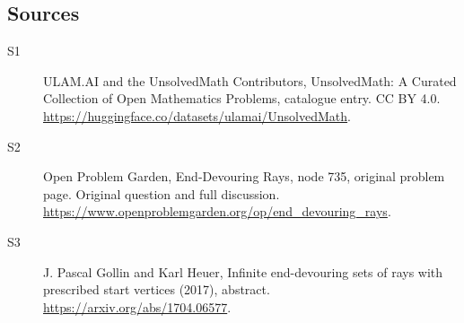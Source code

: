 \documentclass[11pt]{article}
\begin{document}
\subsection{Sources}
\begin{description}
\item[\hypertarget{source:statement:1}{S1}] ULAM.AI and the UnsolvedMath Contributors, UnsolvedMath: A Curated Collection of Open Mathematics Problems, catalogue entry. CC BY 4.0. \url{https://huggingface.co/datasets/ulamai/UnsolvedMath}.
\item[\hypertarget{source:statement:2}{S2}] Open Problem Garden, End-Devouring Rays, node 735, original problem page. Original question and full discussion. \url{https://www.openproblemgarden.org/op/end_devouring_rays}.
\item[\hypertarget{source:statement:3}{S3}] J. Pascal Gollin and Karl Heuer, Infinite end-devouring sets of rays with prescribed start vertices (2017), abstract. \url{https://arxiv.org/abs/1704.06577}.
\end{description}
\label{end:statement}
\end{document}
